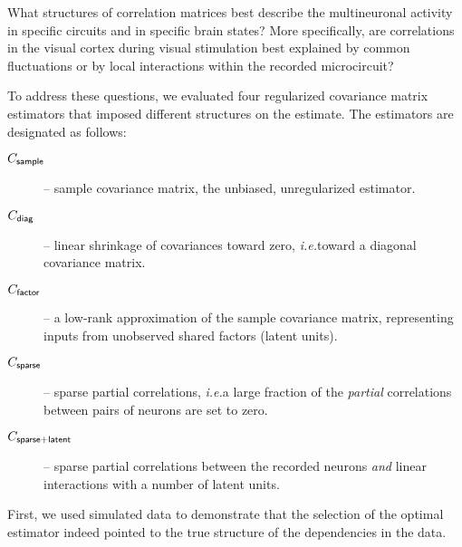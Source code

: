 What structures of correlation matrices best describe the multineuronal activity in specific circuits and in specific brain states?  More specifically, are correlations in the visual cortex during visual stimulation best explained by common fluctuations or by local interactions within the recorded microcircuit?

To address these questions, we evaluated four regularized covariance matrix estimators that imposed different structures on the estimate. The estimators are designated as follows:
\begin{description}
\item[$C_{\sf sample}$] -- sample covariance matrix, the unbiased, unregularized estimator.
\item[$C_{\sf diag}$] -- linear shrinkage of covariances toward zero, \emph{i.e.}\;toward a diagonal covariance matrix.
\item[$C_{\sf factor}$] -- a low-rank approximation of the sample covariance matrix, representing inputs from unobserved shared factors (latent units).
\item[$C_{\sf sparse}$] -- sparse partial correlations, \emph{i.e.}\;a large fraction of the \emph{partial} correlations between pairs of neurons are set to zero.
\item[$C_{\sf sparse+latent}$] -- sparse partial correlations between the recorded neurons \emph{and} linear interactions with a number of latent units.
\end{description}

First, we used simulated data to demonstrate that the selection of the optimal estimator indeed pointed to the true structure of the dependencies in the data.

